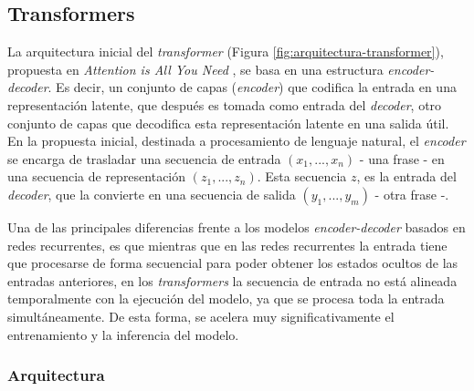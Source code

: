 \subsection{Transformers}
La arquitectura inicial del \textit{transformer} (Figura \ref{fig:arquitectura-transformer}), propuesta en \textit{Attention is All You Need} \cite{NIPS2017_3f5ee243}, se basa en una estructura \textit{encoder-decoder}. Es decir, un conjunto de capas (\textit{encoder}) que codifica la entrada en una representación latente, que después es tomada como entrada del \textit{decoder}, otro conjunto de capas que decodifica esta representación latente en una salida útil. En la propuesta inicial, destinada a procesamiento de lenguaje natural, el \textit{encoder} se encarga de trasladar una secuencia de entrada $(x_1, ..., x_n)$ - una frase - en una secuencia de representación $(z_1, ..., z_n)$. Esta secuencia $z$, es la entrada del \textit{decoder}, que la convierte en una secuencia de salida $(y_1, ..., y_m)$ - otra frase -. 

Una de las principales diferencias frente a los modelos \textit{encoder-decoder} basados en redes recurrentes, es que mientras que en las redes recurrentes la entrada tiene que procesarse de forma secuencial para poder obtener los estados ocultos de las entradas anteriores, en los \textit{transformers} la secuencia de entrada no está alineada temporalmente con la ejecución del modelo, ya que se procesa toda la entrada simultáneamente. De esta forma, se acelera muy significativamente el entrenamiento y la inferencia del modelo.

\subsubsection{Arquitectura}

\vspace{2mm}

